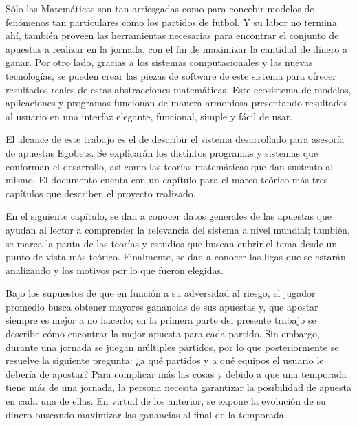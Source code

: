 Sólo las Matemáticas son tan arriesgadas como para concebir modelos de fenómenos tan particulares como los partidos de futbol. Y su labor no termina ahí, también proveen las herramientas necesarias para encontrar el conjunto de apuestas a realizar en la jornada, con el fin de maximizar la cantidad de dinero a ganar. Por otro lado, gracias a los sistemas computacionales y las nuevas tecnologías, se pueden crear las piezas de software de este sistema para ofrecer resultados reales de estas abstracciones matemáticas. Este ecosistema de modelos, aplicaciones y programas funcionan de manera armoniosa presentando resultados al usuario en una interfaz elegante, funcional, simple y fácil de usar. 

El alcance de este trabajo es el de describir el sistema desarrollado para asesoría de apuestas Egobets. Se explicarán los distintos programas y sistemas que conforman el desarrollo, así como las teorías matemáticas que dan sustento al mismo. El documento cuenta con un capítulo para el marco teórico más tres capítulos que describen el proyecto realizado.

En el siguiente capítulo, se dan a conocer datos generales de las apuestas que ayudan al lector a comprender la relevancia del sistema a nivel mundial; también, se marca la pauta de las teorías y estudios que buscan cubrir el tema desde un punto de vista más teórico. Finalmente, se dan a conocer las ligas que se estarán analizando y los motivos por lo que fueron elegidas.

Bajo los supuestos de que en función a su adversidad al riesgo, el jugador promedio busca obtener mayores ganancias de sus apuestas  y, que apostar siempre es mejor a no hacerlo; en la primera parte del presente trabajo se describe cómo encontrar la mejor apuesta para cada partido. Sin embargo, durante una jornada se juegan múltiples partidos, por lo que posteriormente se resuelve la siguiente pregunta: ¿a qué partidos y a qué equipos el usuario le debería de apostar? Para complicar más las cosas y debido a que una temporada tiene más de una jornada, la persona necesita garantizar la posibilidad de apuesta en cada una de ellas. En virtud de los anterior, se expone la evolución de su dinero buscando maximizar las ganancias al final de la temporada. 


